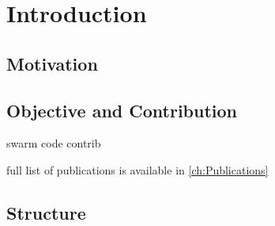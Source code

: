 
\chapter{Introduction}
\label{ch:Introduction}


\section{Motivation}
\label{ch:Introduction:sec:Motivation}


\section{Objective and Contribution}
\label{ch:Introduction:sec:ObjectiveContribution}

swarm code contrib \cite{Mahe2014,Mahe2015}

full list of publications is available in \ref{ch:Publications}


\section{Structure}
\label{ch:Introduction:sec:Structure}
